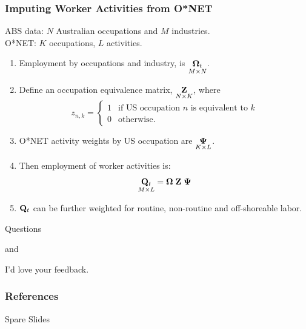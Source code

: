 \documentclass[red]{beamer}
\begin{document}
\begin{frame}
  \frametitle{Imputing Worker Activities from O*NET}
ABS data: $N$ Australian occupations and $M$ industries.\\
O*NET: $K$ occupations, $L$ activities.
  \begin{enumerate}
  \item Employment by occupations and industry, is 
    $\underset{M\times N}{{\bf \Omega}_t}$.
  \item Define an occupation equivalence matrix, $\underset{N\times K}{\bf Z}$, where \vspace{-10pt}   \[
    z_{n,k} = \left\{ 
      \begin{array}{ll}1 &\text{if US occupation $n$ is equivalent to $k$}\\
      0 & \text{otherwise.}\end{array}\right.
    \]
  \item O*NET activity weights by US occupation are $\underset{K\times L}{\bf \Psi}$.
  \item Then employment of worker activities is:
    $$ \underset{M\times L}{{\bf Q}_t} = {\bf \Omega\; Z\; \Psi} $$
  \item ${{\bf Q}_t}$ can be further weighted for routine, non-routine and off-shoreable labor.
  \end{enumerate}
\end{frame}

\begin{frame}
  \begin{center}
    Questions
    \vspace{1cm}

    and
    \vspace{1cm}

    I'd love your feedback.
  \end{center}
\end{frame}

\begin{frame}
\frametitle{References}
\printbibliography
\end{frame}

\begin{frame}
  \begin{center}
    Spare Slides
  \end{center}
\end{frame}
\end{document}
